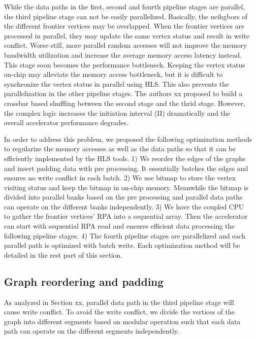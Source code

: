 While the data paths in the first, second and fourth pipeline stages are parallel,
the third pipeline stage can not be easily parallelized. Basically, the neihgbors of 
the different frontier vertices may be overlapped. When the frontier vertices are 
processed in parallel, they may update the same vertex status and result in write 
conflict. Worse still, more parallel random accesses will not improve the memory 
bandwidth utilization and increase the average memory access latency instead. 
This stage soon becomes the performance bottleneck. Keeping the vertex status on-chip 
may alleviate the memory access bottleneck, but it is difficult to synchronize the 
vertex status in parallel using HLS. This also prevents the parallelization in the 
other pipeline stages. The authors xx proposed to build a crossbar based shuffling 
between the second stage and the thrid stage. However, the complex logic increases the 
initiation interval (II) dramatically and the overall accelerator performance degrades.

In order to address this problem, we proposed the following optimization methods 
to regularize the memory accesses as well as the data paths so that it can be 
efficiently implemented by the HLS tools. 1) We reorder the edges of the graphs and insert 
padding data with pre processing. It essentially batches the edges and ensures 
no write conflict in each batch. 2) We use bitmap to store the vertex visiting status and 
keep the bitmap in on-chip memory. Meanwhile the bitmap is divided into parallel banks 
based on the pre processing and parallel data paths can operate on the different 
banks independently. 3) We have the coupled CPU to gather the frontier vertices' RPA into 
a sequential array. Then the accelerator can start with sequential RPA read and ensures 
efficient data processing the following pipeline stages. 4) The fourth pipeline stages 
are parallelized and each parallel path is optimized with batch write. Each optimization method
will be detailed in the rest part of this section.

\subsection{Graph reordering and padding}
As analyzed in Section xx, parallel data path in the third pipeline stage will cause 
write conflict. To avoid the write conflict, we divide the vertices of the graph into 
different segments based on modular operation such that each data path can operate on 
the different segments independently. 

